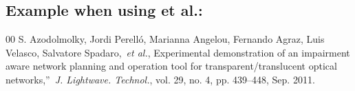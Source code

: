 \documentclass{IEEEtran}
\begin{document}
\subsection*{Example when using et al.:}

\begin{thebibliography}{00}
 S. Azodolmolky, Jordi Perell\'{o}, Marianna Angelou, Fernando Agraz, Luis Velasco, Salvatore Spadaro,~\textit{et al.}, Experimental demonstration of an impairment aware network planning and operation tool for transparent/translucent optical networks,''~\textit{J. Lightwave. Technol.}, vol. 29, no. 4, pp. 439--448, Sep. 2011.~
\end{thebibliography}
\end{document}
